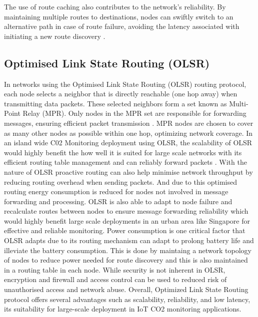 The use of route caching also contributes to the network's reliability. By maintaining multiple routes to destinations, nodes can swiftly switch to an alternative path in case of route failure, avoiding the latency associated with initiating a new route discovery \cite{1431308}.

\subsection*{Optimised Link State Routing (OLSR)}

In networks using the Optimised Link State Routing (OLSR) routing protocol, each node selects a neighbor that is directly reachable (one hop away) when transmitting data packets. These selected neighbors form a set known as Multi-Point Relay (MPR). Only nodes in the MPR set are responsible for forwarding messages, ensuring efficient packet transmission\cite{Kakade2017Performance} \cite{OLSR_IETF}. MPR nodes are chosen to cover as many other nodes as possible within one hop, optimizing network coverage\cite{Ahn2014-ii}. 
In an island wide C02  Monitoring deployment using OLSR, the scalability of OLSR would highly benefit the how well it is suited for large scale networks with its efficient routing table management and can reliably forward packets . 
With the nature of OLSR proactive routing can also help minimise network throughput by reducing routing overhead when sending packets. And due to this optimised routing energy consumption is reduced for nodes not involved in message forwarding and processing\cite{Guo_2011}.
OLSR is also able to adapt to node failure and recalculate routes between nodes to ensure message forwarding reliability which would highly benefit large scale deployments in an urban area like Singapore for effective and reliable monitoring.
Power consumption is one critical factor that OLSR adapts due to its routing mechanism can adapt to prolong battery life and illeviate the battery consumption\cite{Jubair_2019}. This is done by maintaing a network topology of nodes to reduce power needed for route discovery and this is also maintained in a routing table in each node.
While security is not inherent in OLSR, encryption and firewall and access control can be used to reduced risk of unauthorised access and network abuse.
Overall, Optimized Link State Routing protocol offers several advantages such as scalability, reliability, and low latency, its suitability for large-scale deployment in IoT CO2 monitoring applications.








